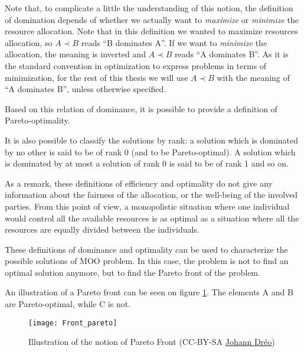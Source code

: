 Note that, to complicate a little the understanding of this notion, the definition of domination depends of whether we actually want to \emph{maximize} or \emph{minimize} the resource allocation. Note that in this definition we wanted to maximize resources allocation, so \(A \prec B\) reads \enquote{B dominates A}. If we want to \emph{minimize} the allocation, the meaning is inverted and \(A \prec B\) reads \enquote{A dominates B}.
As it is the standard convention in optimization to express problems in terms of minimization, for the rest of this thesis we will use \(A \prec B\) with the meaning of \enquote{A dominates B}, unless otherwise specified.

Based on this relation of dominance, it is possible to provide a definition of Pareto-optimality.



It is also possible to classify the solutions by rank: a solution which is dominated by no other is said to be of rank 0 (and to be Pareto-optimal). A solution which is dominated by at most a solution of rank 0 is said to be of rank 1 and so on.

As a remark, these definitions of efficiency and optimality do not give any information about the fairness of the allocation, or the well-being of the involved parties. From this point of view, a monopolistic situation where one individual would control all the available resources is as optimal as a situation where all the resources are equally divided between the individuals.

These definitions of dominance and optimality can be used to characterize the possible solutions of MOO problem. In this case, the problem is not to find an optimal solution anymore, but to find the Pareto front of the problem.

An illustration of a Pareto front can be seen on figure \ref{Front_Pareto}. The elements A and B are Pareto-optimal, while C is not.

\begin{figure}
\centering
\texttt{[image: Front\_pareto]}\\
\caption{Illustration of the notion of Pareto Front (CC-BY-SA \href{http://en.wikipedia.org/wiki/File:Front_pareto.svg}{Johann Dréo})}
\label{Front_Pareto}
\end{figure}

